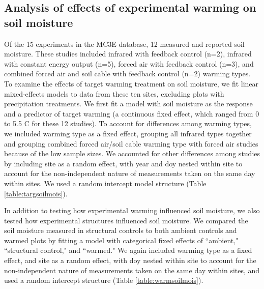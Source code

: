 \documentclass{article}
\begin{document}
\subsection* {Analysis of effects of experimental warming on soil moisture}
Of the 15 experiments in the MC3E database, 12 measured and reported soil moisture. These studies included infrared with feedback control (n=2), infrared with constant energy output (n=5), forced air with feedback control (n=3), and combined forced air and soil cable with feedback control (n=2) warming types. To examine the effects of target warming treatment on soil moisture, we fit linear mixed-effects models to data from these ten sites, excluding plots with precipitation treatments. We first fit a model with soil moisture as the response and a predictor of target warming (a continuous fixed effect, which ranged from 0 to 5.5 \degree C for these 12 studies). To account for differences among warming types, we included warming type as a fixed effect, grouping all infrared types together and grouping combined forced air/soil cable warming type with forced air studies because of the low sample sizes. We accounted for other differences among studies by including site as a random effect, with year and doy nested within site to account for the non-independent nature of measurements taken on the same day within sites.  We used a random intercept model structure (Table \ref{table:targsoilmois}). 

\par In addition to testing how experimental warming influenced soil moisture, we also tested how experimental structures influenced soil moisture. We compared the soil moisture measured in structural controls to both ambient controls and warmed plots by fitting a model with categorical fixed effects of ``ambient," ``structural control," and ``warmed."  We again included warming type as a fixed effect, and site as a random effect, with doy nested within site to account for the non-independent nature of measurements taken on the same day within sites, and used a random intercept structure (Table \ref{table:warmsoilmois}). 
\end{document}
